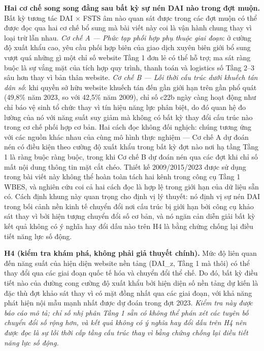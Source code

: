 \documentclass[12pt,a4paper]{article}
\begin{document}
\textbf{Hai cơ chế song song đằng sau bất kỳ sự nén DAI nào trong đợt
muộn.} Bất kỳ tương tác DAI × FSTS âm nào quan sát được trong các đợt
muộn có thể được đọc qua hai cơ chế bổ sung mà bài viết này coi là vận
hành chung thay vì loại trừ lẫn nhau. \emph{Cơ chế A --- Phức tạp phối
hợp phụ thuộc giai đoạn}: ở cường độ xuất khẩu cao, yêu cầu phối hợp
biên của giao dịch xuyên biên giới bổ sung vượt quá những gì một chỉ số
website Tầng 1 đơn lẻ có thể hỗ trợ; ma sát ràng buộc là sự vắng mặt của
tích hợp quy trình, thanh toán và logistics số Tầng 2--3 sâu hơn thay vì
bản thân website. \emph{Cơ chế B --- Lỗi thời cấu trúc dưới khuếch tán
dân số}: khi quyền sở hữu website khuếch tán đến gần giới hạn trên gần
phổ quát (49,8\% năm 2023, so với 42,5\% năm 2009), chỉ số c22b ngày
càng hoạt động như chỉ báo vệ sinh tổ chức thay vì tín hiệu năng lực
phân biệt, do đó quan hệ đo lường của nó với năng suất suy giảm mà không
có bất kỳ thay đổi cấu trúc nào trong cơ chế phối hợp cơ bản. Hai cách
đọc không đối nghịch: chúng tương ứng với các nguồn khác nhau của cùng
mô hình thực nghiệm --- Cơ chế A dự đoán nén có điều kiện theo cường độ
xuất khẩu trong bất kỳ đợt nào nơi hạ tầng Tầng 1 là ràng buộc ràng
buộc, trong khi Cơ chế B dự đoán nén qua các đợt khi chỉ số mất nội dung
thông tin mặt cắt chéo. Thiết kế 2009/2015/2023 được sử dụng trong bài
viết này không thể hoàn toàn tách hai kênh trong công cụ Tầng 1 WBES, và
nghiên cứu coi cả hai cách đọc là hợp lệ trong giới hạn của dữ liệu sẵn
có. Cách định khung này quan trọng cho định vị lý thuyết: nó định vị sự
nén DAI trong bối cảnh nền kinh tế chuyển đổi nơi cấu trúc bị giới hạn
bởi công cụ khảo sát thay vì bởi hiện tượng chuyển đổi số cơ bản, và nó
ngăn cản diễn giải bất kỳ kết quả không có ý nghĩa hay đổi dấu nào trên
H4 là bằng chứng chống lại điều tiết năng lực số động.

\textbf{H4 (kiểm tra khám phá, không phải giả thuyết chính).} Mức độ
liên quan đến năng suất của hiện diện website nền tảng (DAI\_z, Tầng 1
mà thôi) có thể thay đổi qua các giai đoạn quốc tế hóa và chuyển đổi thể
chế. Do đó, bất kỳ điều tiết nào của đường cong cường độ xuất khẩu bởi
hiện diện số nền tảng dự kiến là đặc thù đợt khảo sát thay vì có mặt
đồng nhất qua các giai đoạn, với khả năng phát hiện nội mẫu mạnh nhất
được dự đoán trong đợt 2023. \emph{Kiểm tra này được báo cáo mô tả; chỉ
số nhị phân Tầng 1 sẵn có không thể phán xét các tuyên bố chuyển đổi số
rộng hơn, và kết quả không có ý nghĩa hay đổi dấu trên H4 nên được đọc
là sự lỗi thời cấp tầng cấu trúc thay vì bằng chứng chống lại điều tiết
năng lực số động.}
\end{document}

